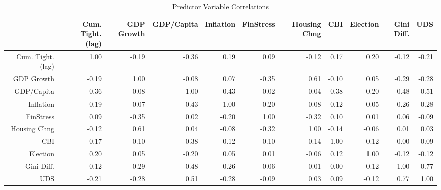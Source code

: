 \begin{table}[ht]
\centering
\caption{Predictor Variable Correlations} 
\begingroup\tiny
\begin{tabular}{rrrrrrrrrrr}
  \hline
 & Cum. Tight. (lag) & GDP Growth & GDP/Capita & Inflation & FinStress & Housing Chng & CBI & Election & Gini Diff. & UDS \\ 
  \hline
Cum. Tight. (lag) & 1.00 & -0.19 & -0.36 & 0.19 & 0.09 & -0.12 & 0.17 & 0.20 & -0.12 & -0.21 \\ 
  GDP Growth & -0.19 & 1.00 & -0.08 & 0.07 & -0.35 & 0.61 & -0.10 & 0.05 & -0.29 & -0.28 \\ 
  GDP/Capita & -0.36 & -0.08 & 1.00 & -0.43 & 0.02 & 0.04 & -0.38 & -0.20 & 0.48 & 0.51 \\ 
  Inflation & 0.19 & 0.07 & -0.43 & 1.00 & -0.20 & -0.08 & 0.12 & 0.05 & -0.26 & -0.28 \\ 
  FinStress & 0.09 & -0.35 & 0.02 & -0.20 & 1.00 & -0.32 & 0.10 & 0.01 & 0.06 & -0.09 \\ 
  Housing Chng & -0.12 & 0.61 & 0.04 & -0.08 & -0.32 & 1.00 & -0.14 & -0.06 & 0.01 & 0.03 \\ 
  CBI & 0.17 & -0.10 & -0.38 & 0.12 & 0.10 & -0.14 & 1.00 & 0.12 & 0.00 & 0.09 \\ 
  Election & 0.20 & 0.05 & -0.20 & 0.05 & 0.01 & -0.06 & 0.12 & 1.00 & -0.12 & -0.12 \\ 
  Gini Diff. & -0.12 & -0.29 & 0.48 & -0.26 & 0.06 & 0.01 & 0.00 & -0.12 & 1.00 & 0.77 \\ 
  UDS & -0.21 & -0.28 & 0.51 & -0.28 & -0.09 & 0.03 & 0.09 & -0.12 & 0.77 & 1.00 \\ 
   \hline
\end{tabular}
\endgroup
\end{table}
